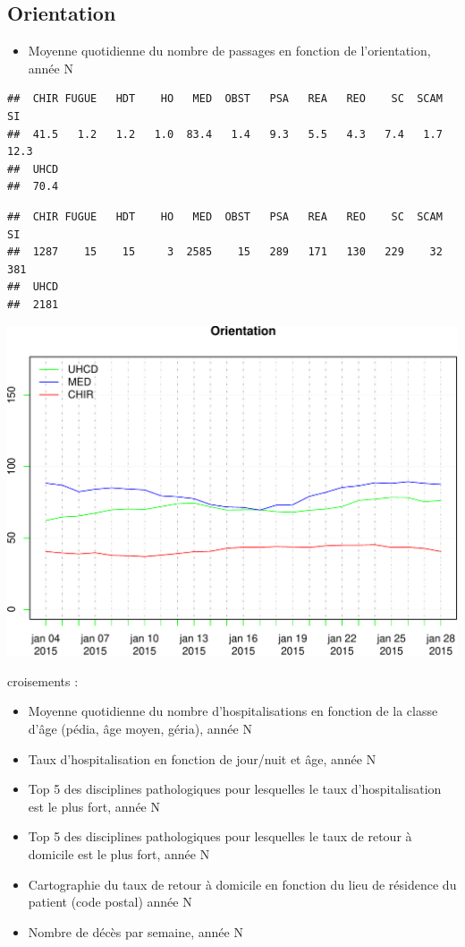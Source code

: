 \documentclass[]{article}
\begin{document}
\subsection{Orientation}\label{orientation}

\begin{itemize}
\itemsep1pt\parskip0pt
\item
  Moyenne quotidienne du nombre de passages en fonction de
  l'orientation, année N
\end{itemize}

\begin{verbatim}
##  CHIR FUGUE   HDT    HO   MED  OBST   PSA   REA   REO    SC  SCAM    SI 
##  41.5   1.2   1.2   1.0  83.4   1.4   9.3   5.5   4.3   7.4   1.7  12.3 
##  UHCD 
##  70.4
\end{verbatim}

\begin{verbatim}
##  CHIR FUGUE   HDT    HO   MED  OBST   PSA   REA   REO    SC  SCAM    SI 
##  1287    15    15     3  2585    15   289   171   130   229    32   381 
##  UHCD 
##  2181
\end{verbatim}

\includegraphics{rapport_2014_files/figure-latex/moyenne-orientation-1.pdf}

croisements :

\begin{itemize}
\itemsep1pt\parskip0pt
\item
  Moyenne quotidienne du nombre d'hospitalisations en fonction de la
  classe d'âge (pédia, âge moyen, géria), année N
\item
  Taux d'hospitalisation en fonction de jour/nuit et âge, année N
\item
  Top 5 des disciplines pathologiques pour lesquelles le taux
  d'hospitalisation est le plus fort, année N
\item
  Top 5 des disciplines pathologiques pour lesquelles le taux de retour
  à domicile est le plus fort, année N
\item
  Cartographie du taux de retour à domicile en fonction du lieu de
  résidence du patient (code postal) année N
\item
  Nombre de décès par semaine, année N
\end{itemize}
\end{document}
